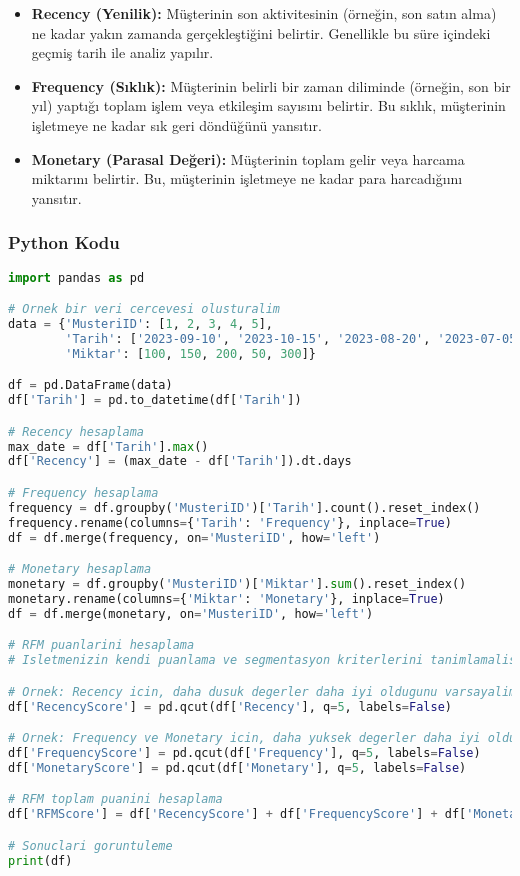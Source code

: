 \begin{itemize}
    \item \textbf{Recency (Yenilik):} Müşterinin son aktivitesinin (örneğin, son satın alma) ne kadar yakın zamanda gerçekleştiğini belirtir. Genellikle bu süre içindeki geçmiş tarih ile analiz yapılır.
    \item \textbf{Frequency (Sıklık):} Müşterinin belirli bir zaman diliminde (örneğin, son bir yıl) yaptığı toplam işlem veya etkileşim sayısını belirtir. Bu sıklık, müşterinin işletmeye ne kadar sık geri döndüğünü yansıtır.
    \item \textbf{Monetary (Parasal Değeri):} Müşterinin toplam gelir veya harcama miktarını belirtir. Bu, müşterinin işletmeye ne kadar para harcadığıını yansıtır.
\end{itemize}

\subsubsection{Python Kodu}

\begin{lstlisting}[language=Python, caption=RFM analizi örneği]
import pandas as pd

# Ornek bir veri cercevesi olusturalim
data = {'MusteriID': [1, 2, 3, 4, 5],
        'Tarih': ['2023-09-10', '2023-10-15', '2023-08-20', '2023-07-05', '2023-09-25'],
        'Miktar': [100, 150, 200, 50, 300]}

df = pd.DataFrame(data)
df['Tarih'] = pd.to_datetime(df['Tarih'])

# Recency hesaplama
max_date = df['Tarih'].max()
df['Recency'] = (max_date - df['Tarih']).dt.days

# Frequency hesaplama
frequency = df.groupby('MusteriID')['Tarih'].count().reset_index()
frequency.rename(columns={'Tarih': 'Frequency'}, inplace=True)
df = df.merge(frequency, on='MusteriID', how='left')

# Monetary hesaplama
monetary = df.groupby('MusteriID')['Miktar'].sum().reset_index()
monetary.rename(columns={'Miktar': 'Monetary'}, inplace=True)
df = df.merge(monetary, on='MusteriID', how='left')

# RFM puanlarini hesaplama
# Isletmenizin kendi puanlama ve segmentasyon kriterlerini tanimlamalisiniz.

# Ornek: Recency icin, daha dusuk degerler daha iyi oldugunu varsayalim.
df['RecencyScore'] = pd.qcut(df['Recency'], q=5, labels=False)

# Ornek: Frequency ve Monetary icin, daha yuksek degerler daha iyi oldugunu varsayalim.
df['FrequencyScore'] = pd.qcut(df['Frequency'], q=5, labels=False)
df['MonetaryScore'] = pd.qcut(df['Monetary'], q=5, labels=False)

# RFM toplam puanini hesaplama
df['RFMScore'] = df['RecencyScore'] + df['FrequencyScore'] + df['MonetaryScore']

# Sonuclari goruntuleme
print(df)
\end{lstlisting}

